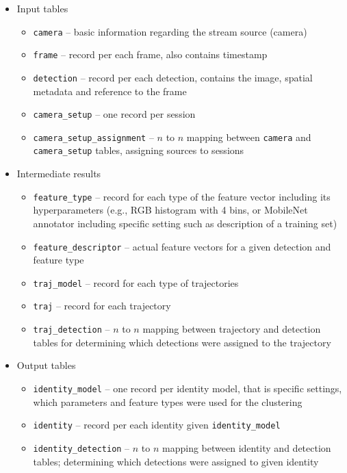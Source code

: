 \begin{itemize}
    \setlength\itemsep{1em}
    \item Input tables \begin{itemize}
        \item \verb+camera+ -- basic information regarding the stream source (camera)
        \item \verb+frame+ -- record per each frame, also contains timestamp
        \item \verb+detection+ -- record per each detection, contains the image, spatial metadata and reference to the frame
        \item \verb+camera_setup+ -- one record per session
        \item \verb+camera_setup_assignment+ -- $n$ to $n$ mapping between \verb+camera+ and \verb+camera_setup+ tables, assigning sources to sessions
    \end{itemize}
    
    \item Intermediate results \begin{itemize}
        \item \verb+feature_type+ -- record for each type of the feature vector including its hyperparameters (e.g., RGB histogram with 4 bins, or MobileNet annotator including specific setting such as description of a training set)
        \item \verb+feature_descriptor+ -- actual feature vectors for a given detection and feature type
        \item \verb+traj_model+ -- record for each type of trajectories
        \item \verb+traj+ -- record for each trajectory
        \item \verb+traj_detection+ -- $n$ to $n$ mapping between trajectory and detection tables for determining which detections were assigned to the trajectory
    \end{itemize}
    
    \item Output tables \begin{itemize}
        \item \verb+identity_model+ -- one record per identity model, that is specific settings, which parameters and feature types were used for the clustering
        \item \verb+identity+ -- record per each identity given \verb+identity_model+
        \item \verb+identity_detection+ -- $n$ to $n$ mapping between identity and detection tables; determining which detections were assigned to given identity
    \end{itemize}
\end{itemize}




